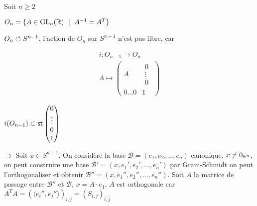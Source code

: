 \documentclass[french,a4paper,10pt]{article}
\begin{document}
	\begin{td-sol}
		Soit $n \geq 2$
		
		$O_n = \{A\in \text{GL}_{n} (\mathbb{R})\ \mid~ A^{-1} = A^T\}$
		
		$O_n \circlearrowleft S^{n-1}$, l'action de $O_n$ sur $S^{n-1}$ n'est pas libre, car 
		
		\[\begin{aligned}
			i: O_{n-1} \to O_n\\
			A \mapsto \begin{pmatrix*}
				A&\begin{matrix*} 0 \\ \vdots\\ 0\end{matrix*}\\
				0 \hdots 0 &1
			\end{pmatrix*}
		\end{aligned}\]
		
		$i(O_{n-1}) \subset \st{\begin{pmatrix*} 0 \\ \vdots\\ 0 \\ 1\end{pmatrix*}}$
		
		$\supset$ 
		Soit $x\in S^{n-1}$. On considère la base $\mathcal{B} = (e_1, e_2, \dots, e_n)$ canonique. $x \neq 0_{\mathbb{R}^n}$,
		on peut construire une base $\mathcal{B}' = (x, e_1', e_2', \dots, e_n')$ par Gram-Schmidt on peut
		l'orthogonaliser et obtenir $\mathcal{B}'' = (x, e_1'', e_2'', \dots, e_n'')$. Soit 
		$A$ la matrice de passage entre $\mathcal{B}''$ et $\mathcal{B}$, $x = A\cdot e_1$, $A$
		est orthogonale car $A^T A = (\langle e_i'', e_j''\rangle)_{i,j} = (S_{i,j})_{i,j}$
	\end{td-sol}
	
\end{document}
